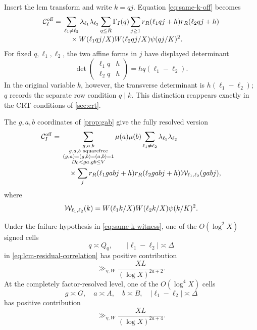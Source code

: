 Insert the lcm transform and write $k=qj$.  Equation
\eqref{eq:same-k-off} becomes
\begin{align}
 \mathcal C_I^{\mathrm{off}}
 ={}&\sum_{\ell_1\ne\ell_2}
 \lambda_{\ell_1}\lambda_{\ell_2}
 \sum_{q\le R}\Gamma_I(q)
 \sum_{j\ge1}
 r_R(\ell_1qj+h)r_R(\ell_2qj+h)
 \notag\\[-0.2em]
 &\quad\times
 W(\ell_1qj/X)W(\ell_2qj/X)\psi(qj/K)^2.
 \label{eq:lcm-residual-correlation}
\end{align}
For fixed $q,\ell_1,\ell_2$, the two affine forms in $j$ have displayed
determinant
\begin{equation}
 \det\begin{pmatrix}\ell_1q&h\\\ell_2q&h\end{pmatrix}
 =hq(\ell_1-\ell_2).
 \label{eq:lcm-j-determinant}
\end{equation}
In the original variable $k$, however, the transverse determinant is
$h(\ell_1-\ell_2)$; $q$ records the separate row condition $q\mid k$.
This distinction reappears exactly in the CRT conditions of
\cref{sec:crt}.

The $g,a,b$ coordinates of \cref{prop:gab} give the fully resolved
version
\begin{align}
 \mathcal C_I^{\mathrm{off}}
 ={}&\sum_{\substack{g,a,b\\
 g,a,b\ \mathrm{squarefree}\\
 (g,a)=(g,b)=(a,b)=1\\
 D_0<ga,gb\le V}}
 \mu(a)\mu(b)
 \sum_{\ell_1\ne\ell_2}
 \lambda_{\ell_1}\lambda_{\ell_2}
 \notag\\
 &\quad\times\sum_j
 r_R(\ell_1gabj+h)r_R(\ell_2gabj+h)
 \mathcal W_{\ell_1,\ell_2}(gabj),
 \label{eq:gab-correlation}
\end{align}
where
\[
 \mathcal W_{\ell_1,\ell_2}(k)
 =W(\ell_1k/X)W(\ell_2k/X)\psi(k/K)^2.
\]

\begin{corollary}
\label{cor:lcm-witnesses}
Under the failure hypothesis in \eqref{eq:same-k-witness}, one of the
$O(\log^2X)$ signed cells
\[
 q\asymp Q_0,\qquad
 |\ell_1-\ell_2|\asymp\Delta
\]
in \eqref{eq:lcm-residual-correlation} has positive contribution
\begin{equation}
 \gg_{\eta,W}\frac{XL}{(\log X)^{2a+2}}.
 \label{eq:q-Delta-witness}
\end{equation}
At the completely factor-resolved level, one of the
$O(\log^4X)$ cells
\[
 g\asymp G,\quad a\asymp A,\quad b\asymp B,\quad
 |\ell_1-\ell_2|\asymp\Delta
\]
has positive contribution
\begin{equation}
 \gg_{\eta,W}\frac{XL}{(\log X)^{2a+4}}.
 \label{eq:GAB-Delta-witness}
\end{equation}
\end{corollary}

